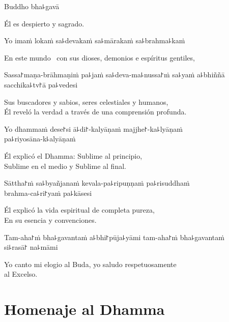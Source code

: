 Buddho bha꜕gavā

\begin{english}
  Él es despierto y sagrado.
\end{english}

Yo imaṁ lokaṁ sa꜕devakaṁ sa꜕mārakaṁ sa꜕brahma꜕kaṁ

\begin{english}
  En este mundo \pause\ con sus dioses, demonios e espíritus gentiles,
\end{english}

Sassa꜓maṇa-brāhmaṇiṁ pa꜕jaṁ sa꜕deva-ma꜕nussa꜓ṁ sa꜕yaṁ a꜕bhiññā sacchika꜕tv꜓ā pa꜕vedesi

\begin{english}
  Sus buscadores y sabios, seres celestiales y humanos,\\ Él reveló la verdad a través de una comprensión profunda.
\end{english}

Yo dhammaṁ dese꜓si ā꜕di꜓-kalyāṇaṁ majjhe꜓-ka꜕lyāṇaṁ \\pa꜕riyosāna-k꜕alyāṇaṁ

\begin{english}
  Él explicó el Dhamma: Sublime al principio,\\ Sublime en el medio y Sublime al final.
\end{english}

Sāttha꜓ṁ sa꜕byañjanaṁ kevala-pa꜕ripuṇṇaṁ pa꜕risuddhaṁ \\brahma-ca꜕ri꜓yaṁ pa꜕kāsesi

\begin{english}
  Él explicó la vida espiritual de completa pureza,\\En su esencia y convenciones.
\end{english}

Tam-aha꜓ṁ bha꜕gavantaṁ a꜕bhi꜓pūja꜕yāmi tam-aha꜓ṁ bha꜕gavantaṁ \\si꜕rasā꜓ na꜕māmi

\begin{english}
  Yo canto mi elogio al Buda, yo saludo respetuosamente \\al Excelso.
\end{english}

\clearpage

\chapter{Homenaje al Dhamma}

\begin{leader}
\end{leader}


